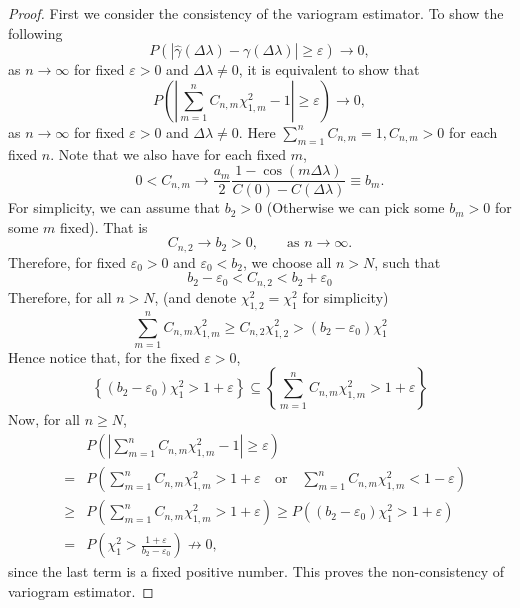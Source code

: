 \begin{proof}
First we consider the consistency of the variogram estimator. To show the following
\[
P\left( \left|\hat{\gamma}(\Delta \lambda) - \gamma(\Delta \lambda)\right| \ge \varepsilon\right) \to 0,
\]
as $n \to \infty$ for fixed $\varepsilon > 0$ and $\Delta \lambda \ne 0$, it is equivalent to show that
\[
P\left( \left|\sum_{m = 1}^n C_{n, m} \chi_{1, m}^2 - 1 \right| \ge \varepsilon\right) \to 0,
\]
as $n \to \infty$ for fixed $\varepsilon > 0$ and $\Delta \lambda \ne 0$. Here $\sum_{m=1}^n C_{n, m} = 1, C_{n, m} > 0$ for each fixed $n$. Note that we also have for each fixed $m$,
\[
0 < C_{n, m} \to \frac{a_m}{2}\frac{1 - \cos(m \Delta \lambda)}{C(0) - C(\Delta \lambda)} \equiv b_m.
\]
For simplicity, we can assume that $b_2 > 0$ (Otherwise we can pick some $b_m > 0$ for some $m$ fixed). That is
\[
C_{n, 2} \to b_2 > 0, \quad \quad \mbox{as $n \to \infty$}.
\]
Therefore, for fixed $\varepsilon_0 > 0$ and $\varepsilon_0 < b_2$, we choose all $n > N$, such that
\[
b_2 - \varepsilon_0 < C_{n, 2} < b_2 + \varepsilon_0
\]
Therefore, for all $n > N$, (and denote $\chi_{1, 2}^2 = \chi_1^2$ for simplicity)
\[
\sum_{m = 1}^n C_{n, m}\chi_{1,m}^2  \ge  C_{n, 2} \chi_{1, 2}^2 > (b_2 - \varepsilon_0) \chi_1^2
\]
Hence notice that, for the fixed $\varepsilon > 0$,
\[
\left\{(b_2 - \varepsilon_0) \chi_{1}^2 > 1 + \varepsilon  \right\} \subseteq \left\{\sum_{m = 1}^n C_{n, m}\chi_{1,m}^2 > 1 + \varepsilon  \right\}
\]
Now, for all $n \ge N$,
\begin{eqnarray*}
& & P\left( \left|\sum_{m = 1}^n C_{n, m} \chi_{1, m}^2 - 1 \right| \ge \varepsilon\right) \\
&=& P\left( \sum_{m = 1}^n C_{n, m} \chi_{1, m}^2 > 1 + \varepsilon \quad \mbox{or} \quad  \sum_{m = 1}^n C_{n, m} \chi_{1, m}^2 < 1 - \varepsilon\right) \\
& \ge & P\left( \sum_{m = 1}^n C_{n, m} \chi_{1, m}^2 > 1 + \varepsilon \right)  \ge  P\left((b_2 - \varepsilon_0) \chi_{1}^2 > 1 + \varepsilon  \right) \\
& = & P\left(\chi_{1}^2 > \frac{1 + \varepsilon}{b_2 - \varepsilon_0}\right) \not\to 0,
\end{eqnarray*}
since the last term is a fixed positive number. This proves the non-consistency of variogram estimator.

\end{proof}



% 



